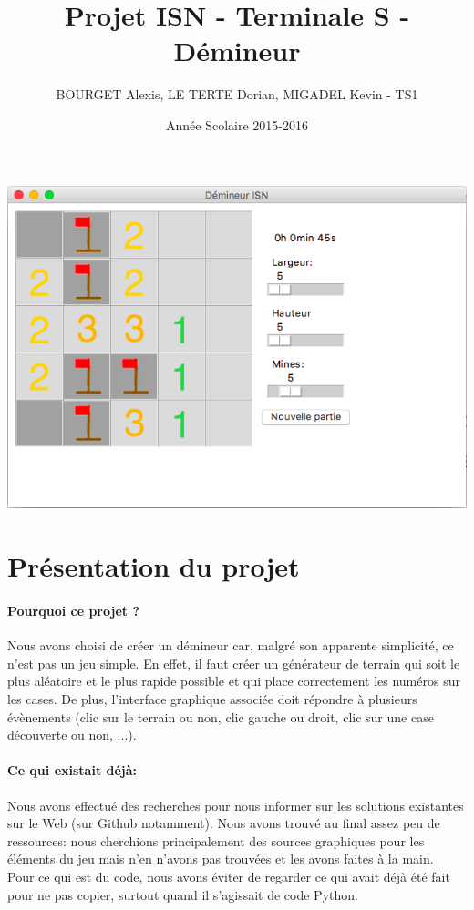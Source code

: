 \documentclass[12pt, a4paper]{article}
\title{Projet ISN - Terminale S - Démineur}
\author{BOURGET Alexis, LE TERTE Dorian, MIGADEL Kevin - TS1}
\date{Année Scolaire 2015-2016}
\begin{document}
\maketitle
\centerline{\includegraphics[scale=0.5]{presentation_projet.png}}
\newpage
{}
\tableofcontents %
\newpage
{} %


\section{Présentation du projet}

\paragraph{Pourquoi ce projet ?}
Nous avons choisi de créer un démineur car, malgré son apparente simplicité,
ce n'est pas un jeu simple. En effet, il faut créer un générateur de terrain
qui soit le plus aléatoire et le plus rapide possible et qui place correctement
les numéros sur les cases. De plus, l'interface graphique associée doit
répondre à plusieurs évènements (clic sur le terrain ou non, clic gauche ou
droit, clic sur une case découverte ou non, ...).

\paragraph{Ce qui existait déjà:}
Nous avons effectué des recherches pour nous informer sur les solutions
existantes sur le Web (sur Github notamment). Nous avons trouvé au final assez
peu de ressources: nous cherchions principalement des sources graphiques pour
les éléments du jeu mais n'en n'avons pas trouvées et les avons faites à la
main. \\
Pour ce qui est du code, nous avons éviter de regarder ce qui avait déjà été
fait pour ne pas copier, surtout quand il s'agissait de code Python.
\end{document}
